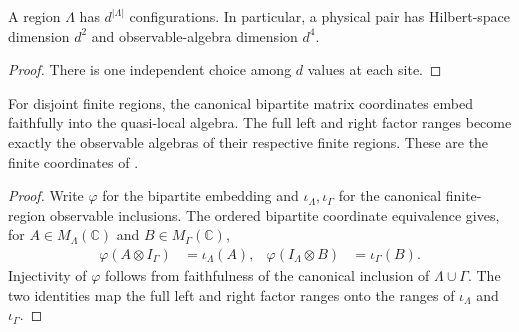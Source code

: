 \begin{lemma}
    \label{lem:qca_finite_region_configuration_count}
    \leanok
    A region $\Lambda$ has $d^{|\Lambda|}$ configurations. In particular,
    a physical pair has Hilbert-space dimension $d^2$ and observable-algebra
    dimension $d^4$.
\end{lemma}
\begin{proof}\leanok
    There is one independent choice among $d$ values at each site.
\end{proof}

\begin{lemma}
    \label{lem:qca_bipartite_observable_embedding}
    \leanok
    For disjoint finite regions, the canonical bipartite matrix coordinates
    embed faithfully into the quasi-local algebra. The full left and right
    factor ranges become exactly the observable algebras of their respective
    finite regions. These are the finite coordinates of
    \cite[lines~1251--1278]{Gross2012IndexTheory}.
\end{lemma}
\begin{proof}\leanok
    Write $\varphi$ for the bipartite embedding and
    $\iota_\Lambda,\iota_\Gamma$ for the canonical finite-region
    observable inclusions. The ordered bipartite coordinate equivalence
    gives, for $A\in M_{\Lambda}(\mathbb C)$ and
    $B\in M_{\Gamma}(\mathbb C)$,
    \begin{align}
        \varphi(A\otimes I_\Gamma)
         & =\iota_\Lambda(A), &
        \varphi(I_\Lambda\otimes B)
         & =\iota_\Gamma(B).
        \label{eq:qca_bipartite_observable_embedding}
    \end{align}
    Injectivity of $\varphi$ follows from faithfulness of the canonical
    inclusion of $\Lambda\cup\Gamma$. The two identities map the full left
    and right factor ranges onto the ranges of $\iota_\Lambda$ and
    $\iota_\Gamma$.
\end{proof}

